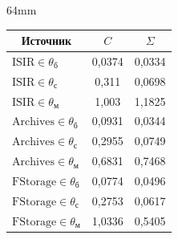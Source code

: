 \begin{floatingfigure}{64mm}


{\small


\vspace*{-12pt}


\begin{center}


\parbox{154pt}{}


\vspace*{2ex}







\begin{tabular}{|l|c|c|}


\hline


\multicolumn{1}{|c|}{Источник}&$C$&$\Sigma$\\


\hline


$\mathrm{ISIR}\in \theta_{\mathrm{б}}$&0,0374&0,0334\\


$\mathrm{ISIR}\in \theta_{\mathrm{с}}$&0,311\hphantom{9}&0,0698\\


$\mathrm{ISIR}\in \theta_{\mathrm{м}}$&1,003\hphantom{9}&1,1825\\


$\mathrm{Archives} \in\theta_{\mathrm{б}}$&0,0931&0,0344\\


$\mathrm{Archives} \in\theta_{\mathrm{с}}$&0,2955&0,0749\\


$\mathrm{Archives} \in\theta_{\mathrm{м}}$&0,6831&0,7468\\


$\mathrm{FStorage} \in\theta_{\mathrm{б}}$&0,0774&0,0496\\


$\mathrm{FStorage} \in\theta_{\mathrm{с}}$&0,2753&0,0617\\


$\mathrm{FStorage} \in\theta_{\mathrm{м}}$&1,0336&0,5405\\


\hline


\end{tabular}


\end{center}


}


\vspace*{9pt}




\end{floatingfigure}





